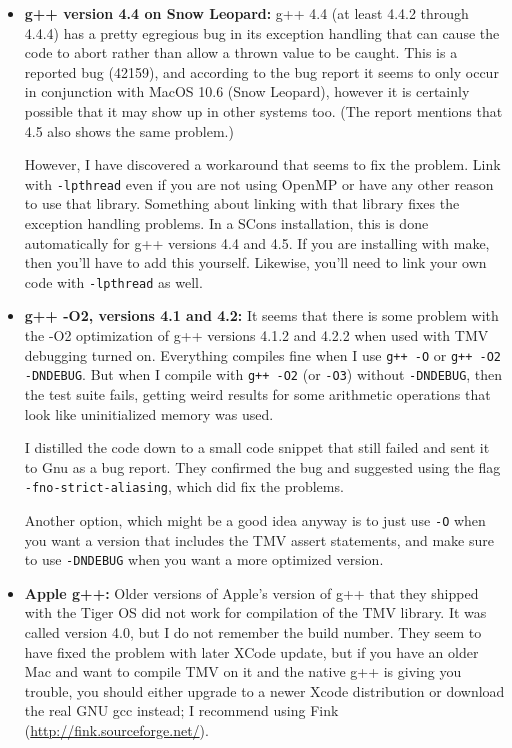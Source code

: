 \documentclass[twoside,letterpaper,11pt]{article}
\renewcommand{\tt}[1]{{\lstinline {#1}}}
\begin{document}
\begin{itemize}
\item {\bf g++ version 4.4 on Snow Leopard:}
g++ 4.4 (at least 4.4.2 through 4.4.4) has a pretty egregious bug in its exception handling that 
can cause the code to abort rather than allow a thrown value to be caught.  
This is a reported bug (42159), and according to the bug report it seems to only occur in
conjunction with MacOS 10.6 (Snow Leopard), however it is certainly possible that it 
may show up in other systems too.  (The report mentions that 4.5 also shows the same problem.)

However, I have discovered a workaround that seems to fix the problem.  Link with 
\tt{-lpthread} even if you are not using OpenMP or have any other reason to use that
library.  Something about linking with that library fixes the exception handling problems.
In a SCons installation, this is done automatically for g++ versions 4.4 and 4.5.  
If you are installing with make, then you'll have to add this yourself.
Likewise, you'll need to link your own code with \tt{-lpthread} as well.

\item {\bf g++ -O2, versions 4.1 and 4.2:}
It seems that there is some problem with the -O2 optimization of g++ versions 4.1.2 and 4.2.2
when used with TMV debugging turned on.  Everything compiles fine when I use
\texttt{g++ -O} or \texttt{g++ -O2 -DNDEBUG}.  But when I compile with \texttt{g++ -O2} (or \texttt{-O3}) without
\texttt{-DNDEBUG}, then the test suite fails, getting weird results for some arithmetic operations
that look like uninitialized memory was used.  

I distilled the code down to a small code snippet that still failed 
and sent it to Gnu as a bug report.
They confirmed the bug and suggested
using the flag \texttt{-fno-strict-aliasing}, which did fix the problems.

Another option, which might be a good idea anyway is to just use \texttt{-O} 
when you want a version that 
includes the TMV assert statements, and make sure to use \texttt{-DNDEBUG} 
when you want a more optimized version.

\item {\bf Apple g++:}
Older versions of Apple's version of g++ that they shipped with the Tiger OS did not work for 
compilation of the TMV library.  It was called version 4.0, but I do not remember the build number.
They seem to have fixed the problem with later XCode update,
but if you have an older Mac and want to compile TMV on it and the native g++ 
is giving you trouble,
you should either upgrade to a newer Xcode distribution or download the real GNU gcc instead;  
I recommend using Fink (\url{http://fink.sourceforge.net/}).


\end{itemize}
\end{document}
